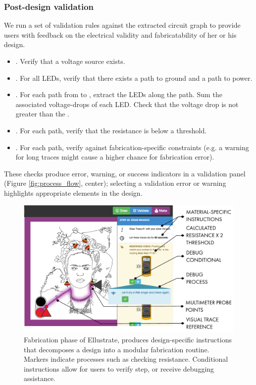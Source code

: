 \documentclass{sigchi}
\begin{document}
    \subsubsection{Post-design validation}
        We run a set of validation rules against the extracted circuit graph to provide users with feedback on the electrical validity and fabricatability of her or his design. 
            \begin{itemize}
                \item {}. Verify that a voltage source exists.
                \item {}. For all LEDs, verify that there exists a path to ground and a path to power.
                \item {}. For each path from  to , extract the LEDs along the path. Sum the associated voltage-drops of each LED. Check that the voltage drop is not greater than the .
                \item {}. For each path, verify that the resistance is below a threshold. 
                \item {}. For each path, verify against fabrication-specific constraints (e.g. a warning for long traces might cause a higher chance for fabrication error).
            \end{itemize}
        These checks produce error, warning, or success indicators in a validation panel (Figure \ref{fig:process_flow}, center); selecting a validation error or warning highlights appropriate elements in the design. 
    
    \begin{figure}[t]
    \centering
    \includegraphics[width=1.0\columnwidth]{figures/fabtool.pdf}
    \caption{Fabrication phase of Ellustrate, produces design-specific instructions that decomposes a design into a modular fabrication routine. Markers indicate processes such as checking resistance. Conditional instructions allow for users to verify step, or receive debugging assistance.}
    \label{fig:fab_tool}
    \vspace{-10pt}
    \end{figure}
\end{document}
